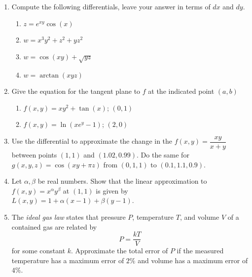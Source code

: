 \documentclass[12pt]{article}
\numberwithin{equation}{subsection}
\numberwithin{figure}{subsection}
\theoremstyle{note}
\begin{document}
{\begin{enumerate}[label=\arabic*.]

\item Compute the following differentials, leave your answer in terms of $dx$ and $dy$.
\begin{enumerate}
	\item $z=e^{xy}\cos(x)$
	\item $w=x^3y^2+z^2+yz^2$
	\item $w=\cos(xy)+\sqrt{yz}$
	\item $w=\arctan(xyz)$
\end{enumerate}

\item Give the equation for the tangent plane to $f$ at the indicated point $(a,b)$
\begin{enumerate}
	\item $f(x,y)=xy^2+\tan(x)$; $(0,1)$
	\item $f(x,y)=\ln(xe^y-1)$; $(2,0)$
\end{enumerate}

\item Use the differential to approximate the change in the $f(x,y)=\dfrac{xy}{x+y}$ between points $(1,1)$ and $(1.02,0.99)$. Do the same for $g(x,y,z)=\cos(xy+\pi z)$ from $(0,1,1)$ to $(0.1,1.1,0.9)$.

\item Let $\alpha,\beta$ be real numbers. Show that the linear approximation to $f(x,y)=x^{\alpha}y^{\beta}$ at $(1,1)$ is given by $L(x,y)=1+\alpha(x-1)+\beta(y-1)$.

\item The \textit{ideal gas law} states that pressure $P$, temperature $T$, and volume $V$ of a contained gas are related by \[ P= \dfrac{kT}{V}\] for some constant $k$. Approximate the total error of $P$ if the measured temperature has a maximum error of $2\%$ and volume has a maximum error of $4\%$.




\end{enumerate}}
\end{document}
